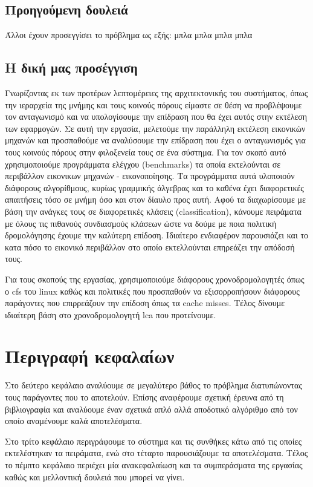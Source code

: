 \subsection{Προηγούμενη δουλειά}
Άλλοι έχουν προσεγγίσει το πρόβλημα ως εξής: μπλα μπλα μπλα μπλα

\subsection{Η δική μας προσέγγιση}
Γνωρίζοντας εκ των προτέρων λεπτομέρειες της αρχιτεκτονικής του συστήματος, όπως
την ιεραρχεία της μνήμης και τους κοινούς πόρους είμαστε σε θέση να προβλέψουμε
τον ανταγωνισμό και να υπολογίσουμε την επίδραση που θα έχει αυτός στην εκτέλεση
των εφαρμογών. Σε αυτή την εργασία, μελετούμε την παράλληλη εκτέλεση εικονικών
μηχανών και προσπαθούμε να αναλύσουμε την επίδραση που έχει ο ανταγωνισμός για
τους κοινούς πόρους στην φιλοξενεία τους σε ένα σύστημα. Για τον σκοπό αυτό
χρησιμοποιούμε προγράμματα ελέγχου (benchmarks) τα οποία εκτελούνται σε
περιβάλλον εικονικων μηχανών - εικονοποίησης. Τα προγράμματα αυτά υλοποιούν
διάφορους αλγορίθμους, κυρίως γραμμικής άλγεβρας και το καθένα έχει διαφορετικές
απαιτήσεις τόσο σε μνήμη όσο και στον δίαυλο προς αυτή. Αφού τα διαχωρίσουμε με
βάση την ανάγκες τους σε διαφορετικές κλάσεις (classification), κάνουμε
πειράματα με όλους τις πιθανούς συνδιασμούς κλάσεων ώστε να δούμε με ποια
πολιτική δρομολόγησης έχουμε την καλύτερη επίδοση. Ιδιαίτερο ενδιαφέρον
παρουσιάζει και το κατα πόσο το εικονικό περιβάλλον στο οποίο εκτελλούνται
επηρεάζει την απόδοσή τους.

Για τους σκοπούς της εργασίας, χρησιμοποιούμε διάφορους χρονοδρομολογητές όπως ο
cfs του linux καθώς και πολιτικές που προσπαθούν να εξισορροπήσουν διάφορους
παράγοντες που επιρρεάζουν την επίδοση όπως τα cache misses. Τέλος δίνουμε
ιδιαίτερη βάση στο χρονοδρομολογητή lca που προτείνουμε.

\section{Περιγραφή κεφαλαίων}
Στο δεύτερο κεφάλαιο αναλύουμε σε μεγαλύτερο βάθος το πρόβλημα διατυπώνοντας
τους παράγοντες που το αποτελούν. Επίσης αναφέρουμε σχετική έρευνα από τη
βιβλιογραφία και αναλύουμε έναν σχετικά απλό αλλά αποδοτικό αλγόριθμο από τον
οποίο αναμένουμε καλά αποτελέσματα.

Στο τρίτο κεφάλαιο περιγράφουμε το σύστημα και τις συνθήκες κάτω από τις οποίες
εκτελέστηκαν τα πειράματα, ενώ στο τέταρτο παρουσιάζουμε τα αποτελέσματα. Τέλος
το πέμπτο κεφάλαιο περιέχει μία ανακεφαλαίωση και τα συμπεράσματα της εργασίας
καθώς και μελλοντική δουλειά που μπορεί να γίνει.

